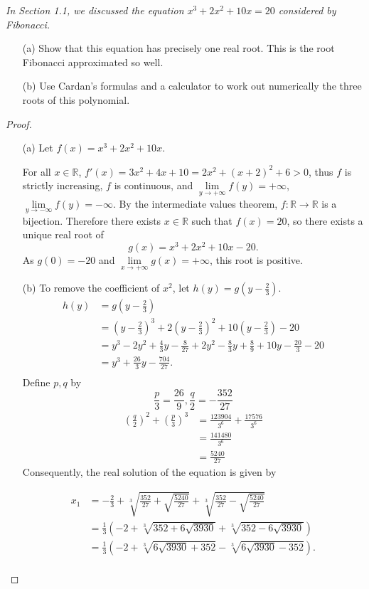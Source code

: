 \documentclass[11pt,a4paper]{article}
\newcommand{\R}{\mathbb{R}}
\begin{document}
{\it In Section 1.1, we discussed the equation $x^3+2x^2+10x = 20$ considered by Fibonacci.
\begin{enumerate}
\item[(a)] Show that this equation has precisely one real root. This is the root Fibonacci approximated so well.
\item[(b)] Use Cardan's formulas and a calculator to work out numerically the three roots of this polynomial.
\end{enumerate}
}

\begin{proof}

\begin{enumerate}
\item[(a)]
Let $f (x) = x^3+2x^2+10x$. 

For all $x\in \mathbb{R}$, $f'(x) = 3 x^2+4x+10 = 2x^2 +(x+2)^2 + 6 >0$, thus  $f$ is strictly increasing, $f$ is continuous, and $\lim\limits_{y\to +\infty} f(y) = +\infty$,  $\lim\limits_{y\to -\infty} f(y) = -\infty$. By the intermediate values theorem, $f : \mathbb{R} \to \mathbb{R}$ is a bijection. Therefore there exists $x\in \R$ such that $f(x) = 20$, so there exists a unique real root of $$g(x) = x^3+2x^2+10x - 20.$$
As $g(0) = -20$ and $\lim\limits_{x\to +\infty} g(x) = +\infty$, this root is positive.


\item[(b)] To remove the coefficient of $x^2$, let $h(y) = g\left(y-\frac{2}{3}\right)$.
\begin{align*}
h(y) &= g\left(y-\frac{2}{3}\right)\\
&=\left(y-\frac{2}{3}\right)^3 + 2\left(y-\frac{2}{3}\right)^2 + 10\left(y-\frac{2}{3}\right)-20\\
&=y^3-2y^2+\frac{4}{3}y-\frac{8}{27} +2y^2-\frac{8}{3}y+\frac{8}{9}+10y -\frac{20}{3}-20\\
&=y^3+\frac{26}{3} y - \frac{704}{27}.\\
\end{align*}
Define $p,q$ by
$$\frac{p}{3} = \frac{26}{9}, \frac{q}{2} = - \frac{352}{27}$$
\begin{align*}
 \left(\frac{q}{2}\right)^2+ \left(\frac{p}{3}\right)^3 &= \frac{123904}{3^6}+\frac{17576}{3^6}\\
 &=\frac{141480}{3^6}\\
 &=\frac{5240}{27}
 \end{align*}
Consequently, the real solution of the equation is given by

\begin{align*}
x_1 &= -\frac{2}{3} + \sqrt[3]{\frac{352}{27} + \sqrt{\frac{5240}{27}}}+ \sqrt[3]{\frac{352}{27} - \sqrt{\frac{5240}{27}}}\\
&=\frac{1}{3} \left( -2+\sqrt[3]{352 + 6\sqrt{3930}} +\sqrt[3]{352 - 6\sqrt{3930}}\right)\\
&=\frac{1}{3}\left(-2+\sqrt[3]{6\sqrt{3930}+352}-\sqrt[3]{6\sqrt{3930}-352}\right).\\
\end{align*}


\end{enumerate}
\end{proof}
\end{document}
